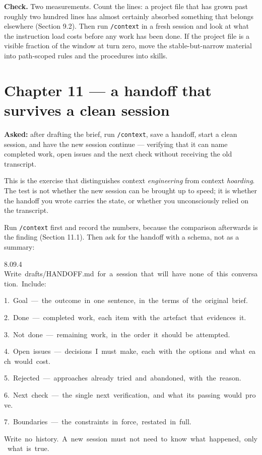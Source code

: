 \documentclass[11pt,a4paper,twoside,openany]{book}
\newcommand{\cl}[1]{\noindent\mbox{#1}\par}
\begin{document}
\textbf{Check.} Two measurements. Count the lines: a project file that has grown past roughly two hundred lines has almost certainly absorbed something that belongs elsewhere (Section 9.2). Then run \texttt{/\allowbreak{}context} in a fresh session and look at what the instruction load costs before any work has been done. If the project file is a visible fraction of the window at turn zero, move the stable-but-narrow material into path-scoped rules and the procedures into skills.


\FloatBarrier
\section*{Chapter 11 — a handoff that survives a clean session}

\textbf{Asked:} after drafting the brief, run \texttt{/\allowbreak{}context}, save a handoff, start a clean session, and have the new session continue — verifying that it can name completed work, open issues and the next check without receiving the old transcript.


This is the exercise that distinguishes context \emph{engineering} from context \emph{hoarding}. The test is not whether the new session can be brought up to speed; it is whether the handoff you wrote carries the state, or whether you unconsciously relied on the transcript.


Run \texttt{/\allowbreak{}context} first and record the numbers, because the comparison afterwards is the finding (Section 11.1). Then ask for the handoff with a schema, not as a summary:


\begin{codeblock}{8.0}{9.4}
\cl{Write~drafts/HANDOFF.md~for~a~session~that~will~have~none~of~this~conversation.~Include:}
\cl{}
\cl{1.~Goal~—~the~outcome~in~one~sentence,~in~the~terms~of~the~original~brief.}
\cl{2.~Done~—~completed~work,~each~item~with~the~artefact~that~evidences~it.}
\cl{3.~Not~done~—~remaining~work,~in~the~order~it~should~be~attempted.}
\cl{4.~Open~issues~—~decisions~I~must~make,~each~with~the~options~and~what~each~would~cost.}
\cl{5.~Rejected~—~approaches~already~tried~and~abandoned,~with~the~reason.}
\cl{6.~Next~check~—~the~single~next~verification,~and~what~its~passing~would~prove.}
\cl{7.~Boundaries~—~the~constraints~in~force,~restated~in~full.}
\cl{}
\cl{Write~no~history.~A~new~session~must~not~need~to~know~what~happened,~only~what~is~true.}
\end{codeblock}
\end{document}
